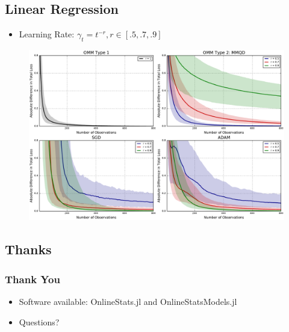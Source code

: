 \documentclass{beamer}
\begin{document}
\subsection{Linear Regression}
\begin{frame}
  \begin{itemize}
    \item Learning Rate: $\gamma_t = t^{-r}, r\in[.5, .7, .9]$
  \end{itemize}
  \begin{figure}
    \includegraphics[width=\textwidth]{figures/linregmm_simulation.pdf}
  \end{figure}
\end{frame}

\subsection{Thanks}
\begin{frame}
  \frametitle{Thank You}
  \begin{itemize}
    \item Software available: OnlineStats.jl and OnlineStatsModels.jl
    \item Questions?
  \end{itemize}
\end{frame}
\end{document}
